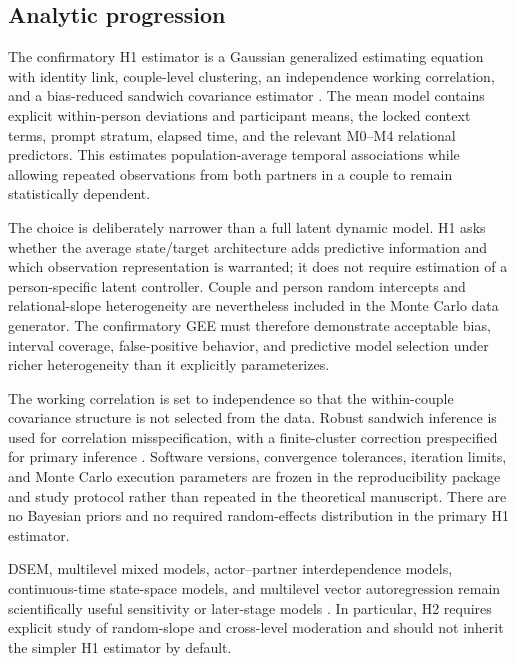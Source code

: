 \subsection{Analytic progression}

The confirmatory H1 estimator is a Gaussian generalized estimating equation with identity link, couple-level clustering, an independence working correlation, and a bias-reduced sandwich covariance estimator \parencite{zeger1986gee,mancl2001gee}. The mean model contains explicit within-person deviations and participant means, the locked context terms, prompt stratum, elapsed time, and the relevant M0--M4 relational predictors. This estimates population-average temporal associations while allowing repeated observations from both partners in a couple to remain statistically dependent.

The choice is deliberately narrower than a full latent dynamic model. H1 asks whether the average state/target architecture adds predictive information and which observation representation is warranted; it does not require estimation of a person-specific latent controller. Couple and person random intercepts and relational-slope heterogeneity are nevertheless included in the Monte Carlo data generator. The confirmatory GEE must therefore demonstrate acceptable bias, interval coverage, false-positive behavior, and predictive model selection under richer heterogeneity than it explicitly parameterizes.

The working correlation is set to independence so that the within-couple covariance structure is not selected from the data. Robust sandwich inference is used for correlation misspecification, with a finite-cluster correction prespecified for primary inference \parencite{zeger1986gee,mancl2001gee}. Software versions, convergence tolerances, iteration limits, and Monte Carlo execution parameters are frozen in the reproducibility package and study protocol rather than repeated in the theoretical manuscript. There are no Bayesian priors and no required random-effects distribution in the primary H1 estimator.

DSEM, multilevel mixed models, actor--partner interdependence models, continuous-time state-space models, and multilevel vector autoregression remain scientifically useful sensitivity or later-stage models \parencite{mcneish2020dsem,wang2026dsem,holtmann2025latent}. In particular, H2 requires explicit study of random-slope and cross-level moderation and should not inherit the simpler H1 estimator by default.

